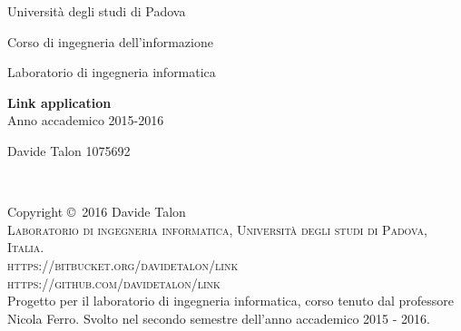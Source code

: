 \documentclass[11pt,fleqn]{book} %
\begin{document}

\begingroup
\thispagestyle{empty}
\centering
\vspace*{5cm}
\par\normalfont\fontsize{35}{35}\sffamily\selectfont
{\LARGE Università degli studi di Padova}\par %
{\LARGE Corso di ingegneria dell'informazione}\par %
{\LARGE Laboratorio di ingegneria informatica}\par %
\vspace*{1.5cm}
\textbf{Link application}\\
\vspace*{1.5cm}
{\LARGE Anno accademico 2015-2016}\par %

{\LARGE Davide Talon 1075692}\par %
\endgroup


\newpage
~\vfill
\thispagestyle{empty}

\noindent Copyright \copyright\ 2016 Davide Talon\\ %

\noindent \textsc{Laboratorio di ingegneria informatica, Università degli studi di Padova, Italia.}\\

\noindent \textsc{https://bitbucket.org/davidetalon/link}\\ %
\noindent \textsc{https://github.com/davidetalon/link}\\ %

\noindent Progetto per il laboratorio di ingegneria informatica, corso tenuto dal professore Nicola Ferro. Svolto nel secondo semestre dell'anno accademico 2015 - 2016.\\ %


\end{document}
